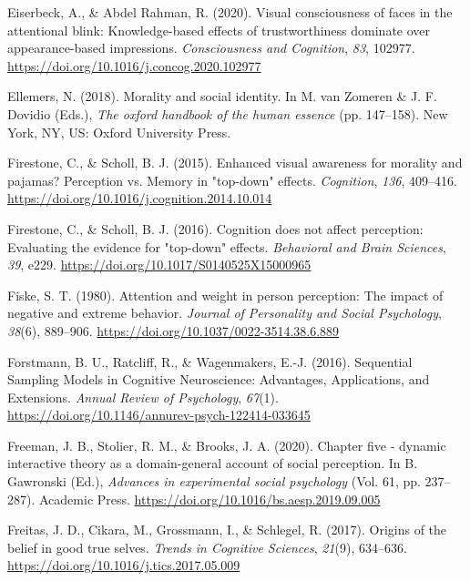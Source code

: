 \documentclass[
  man]{apa6}
\newlength{\cslhangindent}
\newlength{\cslentryspacingunit} %
\newenvironment{CSLReferences}[2] %
 {%
  \setlength{\parindent}{0pt}
  \ifodd #1
  \let\oldpar\par
  \def\par{\hangindent=\cslhangindent\oldpar}
  \fi
  \setlength{\parskip}{#2\cslentryspacingunit}
 }%
 {}
\begin{document}
\begin{CSLReferences}{1}{0}
\leavevmode{}%
Eiserbeck, A., \& Abdel Rahman, R. (2020). Visual consciousness of faces in the attentional blink: Knowledge-based effects of trustworthiness dominate over appearance-based impressions. \emph{Consciousness and Cognition}, \emph{83}, 102977. \url{https://doi.org/10.1016/j.concog.2020.102977}

\leavevmode{}%
Ellemers, N. (2018). Morality and social identity. In M. van Zomeren \& J. F. Dovidio (Eds.), \emph{The oxford handbook of the human essence} (pp. 147--158). New York, {NY}, {US}: Oxford University Press.

\leavevmode{}%
Firestone, C., \& Scholl, B. J. (2015). Enhanced visual awareness for morality and pajamas? Perception vs. Memory in "top-down" effects. \emph{Cognition}, \emph{136}, 409--416. \url{https://doi.org/10.1016/j.cognition.2014.10.014}

\leavevmode{}%
Firestone, C., \& Scholl, B. J. (2016). Cognition does not affect perception: {Evaluating} the evidence for "top-down" effects. \emph{Behavioral and Brain Sciences}, \emph{39}, e229. \url{https://doi.org/10.1017/S0140525X15000965}

\leavevmode{}%
Fiske, S. T. (1980). Attention and weight in person perception: The impact of negative and extreme behavior. \emph{Journal of Personality and Social Psychology}, \emph{38}(6), 889--906. \url{https://doi.org/10.1037/0022-3514.38.6.889}

\leavevmode{}%
Forstmann, B. U., Ratcliff, R., \& Wagenmakers, E.-J. (2016). Sequential {Sampling} {Models} in {Cognitive} {Neuroscience}: {Advantages}, {Applications}, and {Extensions}. \emph{Annual Review of Psychology}, \emph{67}(1). \url{https://doi.org/10.1146/annurev-psych-122414-033645}

\leavevmode{}%
Freeman, J. B., Stolier, R. M., \& Brooks, J. A. (2020). Chapter five - dynamic interactive theory as a domain-general account of social perception. In B. Gawronski (Ed.), \emph{Advances in experimental social psychology} (Vol. 61, pp. 237--287). Academic Press. \url{https://doi.org/10.1016/bs.aesp.2019.09.005}

\leavevmode{}%
Freitas, J. D., Cikara, M., Grossmann, I., \& Schlegel, R. (2017). Origins of the belief in good true selves. \emph{Trends in Cognitive Sciences}, \emph{21}(9), 634--636. \url{https://doi.org/10.1016/j.tics.2017.05.009}


\end{CSLReferences}
\end{document}
